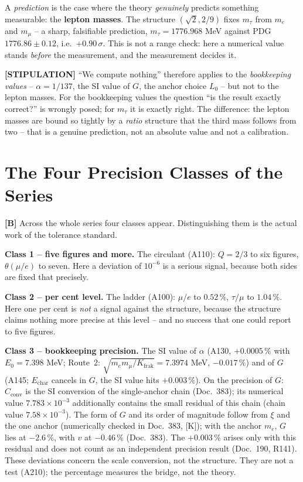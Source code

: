 A \emph{prediction} is the case where the theory \emph{genuinely} predicts
something measurable: the \textbf{lepton masses}. The structure $(\sqrt2, 2/9)$
fixes $m_\tau$ from $m_e$ and $m_\mu$ -- a sharp, falsifiable prediction,
$m_\tau = 1776{.}968$ MeV against PDG $1776{.}86\pm0{.}12$, i.e.\ $+0{.}90\,\sigma$.
This is not a range check: here a numerical value stands \emph{before} the
measurement, and the measurement decides it.

\textbf{[STIPULATION]} ``We compute nothing'' therefore applies to the
\emph{bookkeeping values} -- $\alpha = 1/137$, the SI value of $G$, the anchor
choice $L_0$ -- but not to the lepton masses. For the bookkeeping values the
question ``is the result exactly correct?'' is wrongly posed; for $m_\tau$ it
is exactly right. The difference: the lepton masses are bound so tightly by a
\emph{ratio} structure that the third mass follows from two -- that is a genuine
prediction, not an absolute value and not a calibration.

\section{The Four Precision Classes of the Series}

\textbf{[B]} Across the whole series four classes appear. Distinguishing them is
the actual work of the tolerance standard.

\textbf{Class 1 -- five figures and more.} The circulant (A110): $Q=2/3$ to six
figures, $\theta(\mu/e)$ to seven. Here a deviation of $10^{-6}$ is a serious
signal, because both sides are fixed that precisely.

\textbf{Class 2 -- per cent level.} The ladder (A100): $\mu/e$ to $0{.}52\,\%$,
$\tau/\mu$ to $1{.}04\,\%$. Here one per cent is \emph{not} a signal against the
structure, because the structure claims nothing more precise at this level -- and
no success that one could report to five figures.

\textbf{Class 3 -- bookkeeping precision.} The SI value of $\alpha$ (A130,
$+0{.}0005\,\%$ with $E_0=7.398$ MeV; Route~2: $\sqrt{m_em_\mu/K_\text{frak}}=7.3974$ MeV,
$-0{.}017\,\%$) and of $G$ (A145; $E_\text{char}$ cancels in $G$, the SI value hits
$+0{.}003\,\%$). On the precision of $G$: $C_{\text{conv}}$ is the SI conversion of
the single-anchor chain (Doc.~383); its numerical value $7.783\times10^{-3}$
additionally contains the small residual of this chain (chain value $7.58\times10^{-3}$).
The form of $G$ and its order of magnitude follow from $\xi$ and the one anchor
(numerically checked in Doc.~383, [K]); with the anchor $m_e$, $G$ lies at $-2.6\,\%$,
with $v$ at $-0.46\,\%$ (Doc.~383). The $+0.003\,\%$ arises only with this residual
and does not count as an independent precision result (Doc.~190, R141).
These
deviations concern the scale conversion, not the structure. They are not a test
(A210); the percentage measures the bridge, not the theory.

